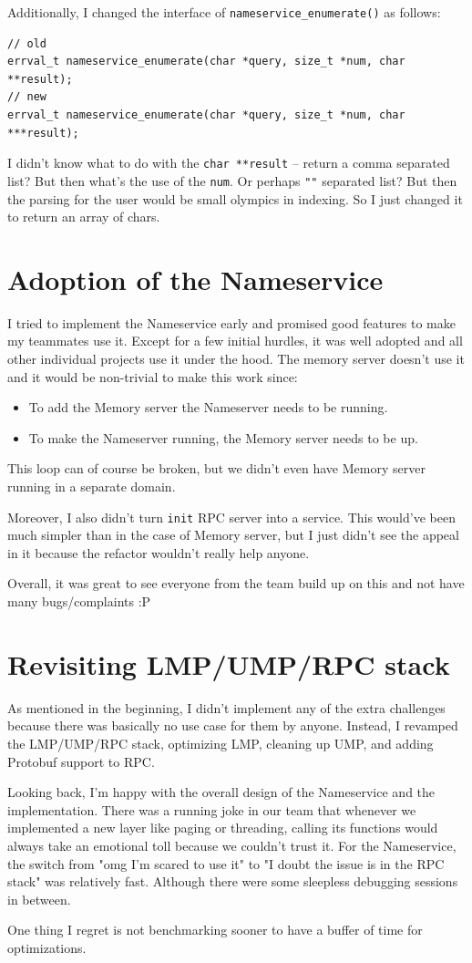 Additionally, I changed the interface of \texttt{nameservice_enumerate()} as follows:
\begin{verbatim}
// old
errval_t nameservice_enumerate(char *query, size_t *num, char **result);
// new
errval_t nameservice_enumerate(char *query, size_t *num, char ***result);
\end{verbatim}
I didn't know what to do with the \texttt{char **result} -- return a comma separated list? But then what's the use of the \texttt{num}. Or perhaps \texttt{"\0"} separated list? But then the parsing for the user would be small olympics in indexing. So I just changed it to return an array of chars.

\section{Adoption of the Nameservice}
I tried to implement the Nameservice early and promised good features to make my teammates use it. Except for a few initial hurdles, it was well adopted and all other individual projects use it under the hood. The memory server doesn't use it and it would be non-trivial to make this work since:
\begin{itemize}
    \item To add the Memory server the Nameserver needs to be running.
    \item To make the Nameserver running, the Memory server needs to be up.
\end{itemize}
This loop can of course be broken, but we didn't even have Memory server running in a separate domain.

Moreover, I also didn't turn \texttt{init} RPC server into a service. This would've been much simpler than in the case of Memory server, but I just didn't see the appeal in it because the refactor wouldn't really help anyone.

Overall, it was great to see everyone from the team build up on this and not have many bugs/complaints :P

\section{Revisiting LMP/UMP/RPC stack}
As mentioned in the beginning, I didn't implement any of the extra challenges because there was basically no use case for them by anyone. Instead, I revamped the LMP/UMP/RPC stack, optimizing LMP, cleaning up UMP, and adding Protobuf support to RPC. 

\begin{hindsight}
Looking back, I'm happy with the overall design of the Nameservice and the implementation. There was a running joke in our team that whenever we implemented a new layer like paging or threading, calling its functions would always take an emotional toll because we couldn't trust it. For the Nameservice, the switch from "omg I'm scared to use it" to "I doubt the issue is in the RPC stack" was relatively fast. Although there were some sleepless debugging sessions in between.

One thing I regret is not benchmarking sooner to have a buffer of time for optimizations.
\end{hindsight}